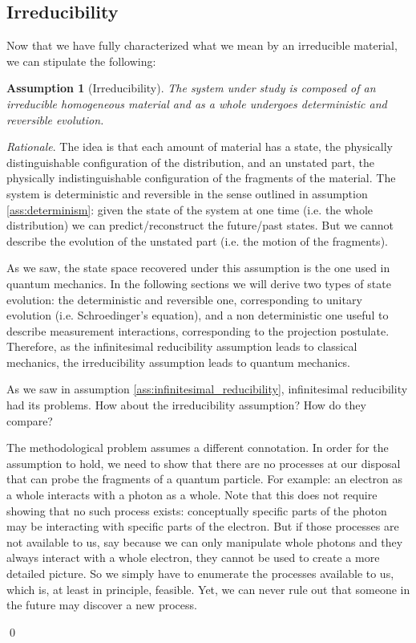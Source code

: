 \documentclass[aps,pra,10pt,twocolumn,floatfix,nofootinbib]{revtex4-1}
\numberwithin{equation}{section}
\newtheorem{assump}{Assumption}
\theoremstyle{definition}
\newenvironment{rationale}{\emph{Rationale}.}{\qed}
\begin{document}
\subsection{Irreducibility}

Now that we have fully characterized what we mean by an irreducible material, we can stipulate the following:

\begin{assump}[Irreducibility]\label{ass:irreducibility}
	The system under study is composed of an irreducible homogeneous material and as a whole undergoes deterministic and reversible evolution.
\end{assump}

\begin{rationale}
	The idea is that each amount of material has a state, the physically distinguishable configuration of the distribution, and an unstated part, the physically indistinguishable configuration of the fragments of the material. The system is deterministic and reversible in the sense outlined in assumption \ref{ass:determinism}: given the state of the system at one time (i.e. the whole distribution) we can predict/reconstruct the future/past states. But we cannot describe the evolution of the unstated part (i.e. the motion of the fragments).
	
	As we saw, the state space recovered under this assumption is the one used in quantum mechanics. In the following sections we will derive two types of state evolution: the deterministic and reversible one, corresponding to unitary evolution (i.e.  Schroedinger's equation), and a non deterministic one useful to describe measurement interactions, corresponding to the projection postulate. Therefore, as the infinitesimal reducibility assumption leads to classical mechanics, the irreducibility assumption leads to quantum mechanics.
	
	As we saw in assumption \ref{ass:infinitesimal_reducibility}, infinitesimal reducibility had its problems. How about the irreducibility assumption? How do they compare?
	
	The methodological problem assumes a different connotation. In order for the assumption to hold, we need to show that there are no processes at our disposal that can probe the fragments of a quantum particle. For example: an electron as a whole interacts with a photon as a whole. Note that this does not require showing that no such process exists: conceptually specific parts of the photon may be interacting with specific parts of the electron. But if those processes are not available to us, say because we can only manipulate whole photons and they always interact with a whole electron, they cannot be used to create a more detailed picture. So we simply have to enumerate the processes available to us, which is, at least in principle, feasible. Yet, we can never rule out that someone in the future may discover a new process.


\end{rationale}
\end{document}
